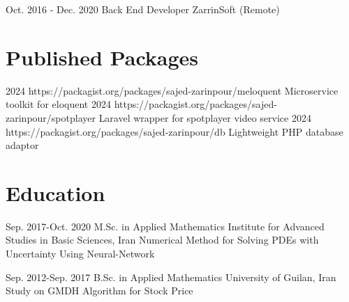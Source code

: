 \documentclass[10pt, a4paper]{article}
\begin{document}
	\expEntry
	{Oct. 2016 - Dec. 2020\hspace{.5cm}}
	{Back End Developer}
	{ZarrinSoft}
	{(Remote)}
	{
	}
	
	\section*{Published Packages}
	\packageEntry
	{2024}
	{
		https://packagist.org/packages/sajed-zarinpour/meloquent
	}
	{Microservice toolkit for eloquent}
	\packageEntry
	{2024}
	{
		https://packagist.org/packages/sajed-zarinpour/spotplayer
	}
	{Laravel wrapper for spotplayer video service}
	\packageEntry
	{2024}
	{
		https://packagist.org/packages/sajed-zarinpour/db
	}
	{Lightweight PHP database adaptor }

	\section*{Education} 
	\eduEntry
	{Sep. 2017-Oct. 2020\hspace{.5cm}}
	{M.Sc. in Applied Mathematics}
	{Institute for Advanced Studies in Basic Sciences, Iran}
	{Numerical Method for Solving PDEs with Uncertainty Using Neural-Network}
	{}

	\eduEntry
	{Sep. 2012-Sep. 2017\hspace{.5cm}}
	{B.Sc. in Applied Mathematics}
	{University of Guilan, Iran}
	{Study on GMDH Algorithm for Stock Price}
	{}
	
	

	
\end{document}
